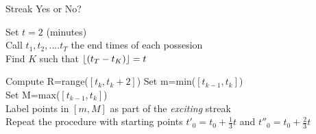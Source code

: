 \documentclass[12 pt,a4paper]{article}
\DeclarePairedDelimiter\floor{\lfloor}{\rfloor}
\theoremstyle{plain}
\theoremstyle{definition}
\theoremstyle{remark}
\begin{document}
\begin{algorithm}
\caption{Streak Yes or No?}
\begin{algorithmic} 
\vspace{0.6cm}
\STATE Set $t=2$ (minutes) \\
Call $t_1,t_2,....t_T$ the end times of each possesion \\
Find $K$ such that $\floor*{(t_T-t_K)}=t$
\vspace{0.6cm}

\vspace{0.15cm}
\STATE Compute R=range($[t_{k},t_{k}+2]$)
\vspace{0.3cm}
\STATE Set m=min($[t_{k-1},t_k] $) \\
Set M=max($[t_{k-1},t_k]$) \\
Label points in $[m,M]$ as part of the \textit{exciting} streak
\ENDIF
\vspace{0.3cm}
\ENDFOR
\\
\vspace{0.3cm}
Repeat the procedure with starting points $t'_0=t_0+\frac{1}{3}t$ and $t''_0=t_0+\frac{2}{3}t$

\vspace{0.6cm}
\end{algorithmic}
\end{algorithm}
\end{document}
